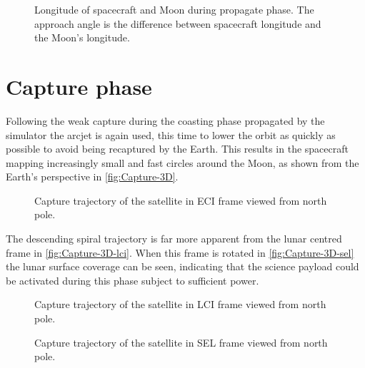 \begin{figure}
\centering
\def\svgwidth{\figurewidth}

\caption{Longitude of spacecraft and Moon during propagate phase. The approach angle is the difference between spacecraft longitude and the Moon's longitude.} \label{fig:Propagate-phase}
\end{figure}


\clearpage


\section{Capture phase} \label{sec:Capture}

Following the weak capture during the coasting phase propagated by the simulator the arcjet is again used, this time to lower the orbit as quickly as possible to avoid being recaptured by the Earth. This results in the spacecraft mapping increasingly small and fast circles around the Moon, as shown from the Earth's perspective in \autoref{fig:Capture-3D}.

\begin{figure}[h]
\centering
\def\svgwidth{\figurewidth}

\caption{Capture trajectory of the satellite in ECI frame viewed from north pole.} \label{fig:Capture-3D}
\end{figure}

The descending spiral trajectory is far more apparent from the lunar centred frame in \autoref{fig:Capture-3D-lci}. When this frame is rotated in \autoref{fig:Capture-3D-sel} the lunar surface coverage can be seen, indicating that the science payload could be activated during this phase subject to sufficient power.

\begin{figure}
\centering
\def\svgwidth{\figurewidth}

\caption{Capture trajectory of the satellite in LCI frame viewed from north pole.} \label{fig:Capture-3D-lci}
\end{figure}

\begin{figure}
\centering
\def\svgwidth{\figurewidth}

\caption{Capture trajectory of the satellite in SEL frame viewed from north pole.} \label{fig:Capture-3D-sel}
\end{figure}

